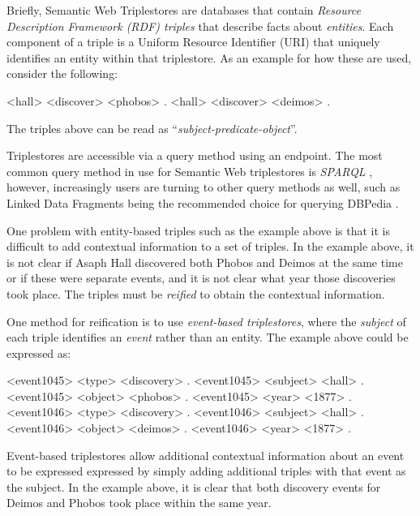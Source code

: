 \documentclass[../main.tex]{subfiles}
\begin{document}
\begin{refsection}
Briefly, Semantic Web Triplestores are databases that contain \textit{Resource Description Framework (RDF) triples} that describe facts about \textit{entities}.  Each component of a triple is a Uniform Resource Identifier (URI) that uniquely identifies an entity within that triplestore.  As an example for how these are used, consider the following:

\begin{code}
    <hall> <discover> <phobos> .
    <hall> <discover> <deimos> .
\end{code}

The triples above can be read as ``\textit{subject-predicate-object}''.

Triplestores are accessible via a query method using an endpoint.  The most common query method in use for Semantic Web triplestores is \textit{SPARQL} \cite{sparql}, however, increasingly users are turning to other query methods as well, such as Linked Data Fragments \cite{verborgh2014web} being the recommended choice for querying DBPedia \cite{dbpedia}.

One problem with entity-based triples such as the example above is that it is difficult to add contextual information to a set of triples.  In the example above, it is not clear if Asaph Hall discovered both Phobos and Deimos at the same time or if these were separate events, and it is not clear what year those discoveries took place.  The triples must be \textit{reified} \cite{antoniou2004semantic} to obtain the contextual information.

One method for reification is to use \textit{event-based triplestores}, where the \textit{subject} of each triple identifies an \textit{event} rather than an entity.  The example above could be expressed as:

\begin{code}
    <event1045> <type> <discovery> .
    <event1045> <subject> <hall> .
    <event1045> <object> <phobos> .
    <event1045> <year> <1877> .
    <event1046> <type> <discovery> .
    <event1046> <subject> <hall> .
    <event1046> <object> <deimos> .
    <event1046> <year> <1877> .
\end{code}

Event-based triplestores allow additional contextual information about an event to be expressed
expressed by simply adding additional triples with that event as the subject.  In the example
above, it is clear that both discovery events for Deimos and Phobos took place within the same year.


\end{refsection}
\end{document}
